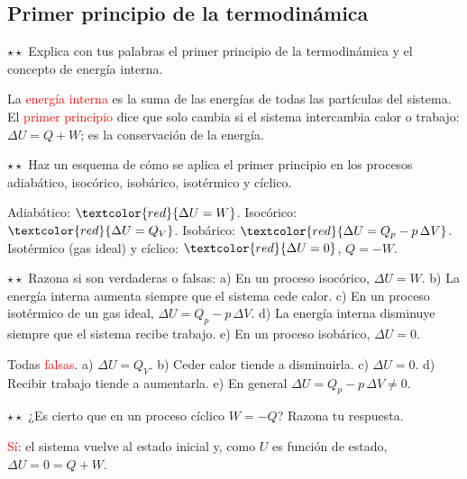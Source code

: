 \subsection{Primer principio de la termodinámica}

\begin{exercise}
    \(\star\star\) Explica con tus palabras el primer principio de la termodinámica y el concepto de energía interna.
    \begin{solu}
        La \textcolor{red}{energía interna} es la suma de las energías de todas las partículas del sistema. El
        \textcolor{red}{primer principio} dice que solo cambia si el sistema intercambia calor o trabajo: \(\Delta U = Q + W\); es
        la conservación de la energía.
    \end{solu}
\end{exercise}

\begin{exercise}
    \(\star\star\) Haz un esquema de cómo se aplica el primer principio en los procesos adiabático, isocórico, isobárico, isotérmico
    y cíclico.
    \begin{solu}
        Adiabático: \(\textcolor{red}{\Delta U = W}\). Isocórico: \(\textcolor{red}{\Delta U = Q_V}\). Isobárico:
        \(\textcolor{red}{\Delta U = Q_p - p\,\Delta V}\). Isotérmico (gas ideal) y cíclico: \(\textcolor{red}{\Delta U = 0}\), \(Q = -W\).
    \end{solu}
\end{exercise}

\begin{exercise}
    \(\star\star\) Razona si son verdaderas o falsas: a) En un proceso isocórico, \(\Delta U = W\). b) La energía interna aumenta
    siempre que el sistema cede calor. c) En un proceso isotérmico de un gas ideal, \(\Delta U = Q_p - p\,\Delta V\). d) La energía
    interna disminuye siempre que el sistema recibe trabajo. e) En un proceso isobárico, \(\Delta U = 0\).
    \begin{solu}
        Todas \textcolor{red}{falsas}. a) \(\Delta U = Q_V\). b) Ceder calor tiende a disminuirla. c) \(\Delta U = 0\). d) Recibir
        trabajo tiende a aumentarla. e) En general \(\Delta U = Q_p - p\,\Delta V \neq 0\).
    \end{solu}
\end{exercise}

\begin{exercise}
    \(\star\star\) ¿Es cierto que en un proceso cíclico \(W = -Q\)? Razona tu respuesta.
    \begin{solu}
        \textcolor{red}{Sí}: el sistema vuelve al estado inicial y, como \(U\) es función de estado, \(\Delta U = 0 = Q + W\).
    \end{solu}
\end{exercise}

